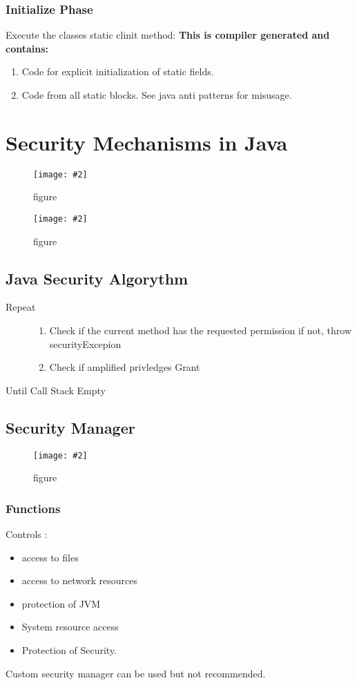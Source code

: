 \documentclass[a4paper,10pt]{scrreprt}
\newcommand{\pic}[2][figure]{\begin{figure}[h]
 \centering
 \texttt{[image: \#2]}
 \caption{#1}
\end{figure}
}
\begin{document}
\subsection{Initialize Phase}
Execute the classes static clinit method:
\textbf{This is compiler generated and contains:}
\begin{enumerate}
 \item Code for explicit initialization of static fields. 
 \item Code from all static blocks.
 \subitem See java anti patterns for misusage.
\end{enumerate}

\chapter{Security Mechanisms in Java}
\pic{jsm.png}
\pic{jsm2.png}
\section{Java Security Algorythm}
\begin{description}
 \item [Repeat] \begin{enumerate}
                 \item Check if the current method has the requested permission if not, throw securityExcepion
                 \item Check if amplified privledges
                 \subitem Grant
                \end{enumerate}
\item[Until Call Stack Empty]
\end{description}

\section{Security Manager}
\pic{secman.png}
\subsection{Functions}
Controls :
\begin{itemize}
 \item access to files
 \item access to network resources
 \item protection of JVM
 \item System resource access
 \item Protection of Security.
\end{itemize}
Custom security manager can be used but not recommended. 
\end{document}
